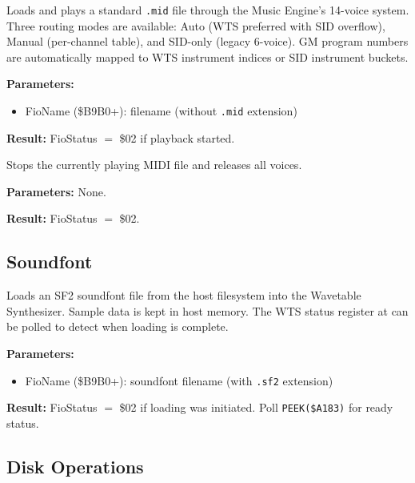 
Loads and plays a standard \texttt{.mid} file through the Music Engine's
14-voice system.  Three routing modes are available: Auto (WTS preferred
with SID overflow), Manual (per-channel table), and SID-only (legacy
6-voice).  GM program numbers are automatically mapped to WTS instrument
indices or SID instrument buckets.

\textbf{Parameters:}
\begin{itemize}
  \item FioName (\$B9B0+): filename (without \texttt{.mid} extension)
\end{itemize}

\textbf{Result:} FioStatus $=$ \$02 if playback started.

\medskip


Stops the currently playing MIDI file and releases all voices.

\textbf{Parameters:} None.

\textbf{Result:} FioStatus $=$ \$02.


\subsection{Soundfont}


Loads an SF2 soundfont file from the host filesystem into the Wavetable
Synthesizer.  Sample data is kept in host memory.  The WTS status register
at  can be polled to detect when loading is complete.

\textbf{Parameters:}
\begin{itemize}
  \item FioName (\$B9B0+): soundfont filename (with \texttt{.sf2} extension)
\end{itemize}

\textbf{Result:} FioStatus $=$ \$02 if loading was initiated.  Poll
\texttt{PEEK(\$A183)} for ready status.


\subsection{Disk Operations}

